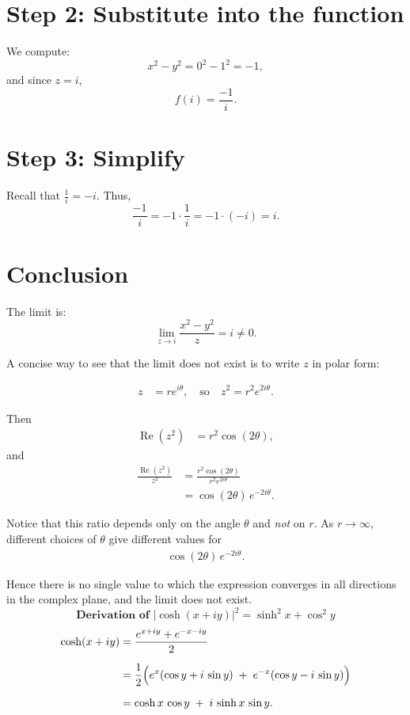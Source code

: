\documentclass[12pt]{article}
\theoremstyle{definition} %
\theoremstyle{plain} %
\begin{document}
\section*{Step 2: Substitute into the function}
We compute:
\[
x^2 - y^2 = 0^2 - 1^2 = -1,
\]
and since \(z = i\),
\[
f(i) = \frac{-1}{i}.
\]

\section*{Step 3: Simplify}
Recall that \(\frac{1}{i} = -i\). Thus,
\[
\frac{-1}{i} = -1 \cdot \frac{1}{i} = -1 \cdot (-i) = i.
\]

\section*{Conclusion}
The limit is:
\[
\lim_{z \to i} \frac{x^2 - y^2}{z} = i \neq 0.
\]

A concise way to see that the limit does not exist is to write $z$ in polar form:

\begin{align}
z &= r e^{i\theta}, \quad \text{so} \quad z^2 = r^2 e^{2i\theta}.
\end{align}

Then
\begin{align}
\operatorname{Re}(z^2) &= r^2 \cos(2\theta),
\end{align}
and
\begin{align}
\frac{\operatorname{Re}(z^2)}{z^2} 
&= \frac{r^2 \cos(2\theta)}{r^2 e^{2i\theta}} \\
&= \cos(2\theta)\,e^{-2i\theta}.
\end{align}

Notice that this ratio depends only on the angle $\theta$ and \emph{not} on $r$. As $r \to \infty$, different choices of $\theta$ give different values for 
\begin{align}
\cos(2\theta)\,e^{-2i\theta}.
\end{align}

Hence there is no single value to which the expression converges in all directions in the complex plane, and the limit does not exist.
\[
\textbf{Derivation of }|\cosh(x + i y)|^2 = \sinh^2 x + \cos^2 y
\]
\begin{align*}
\cosh(x + i y) 
&= \frac{e^{x + i y} + e^{-x - i y}}{2} \\[6pt]
&= \frac{1}{2} \Bigl( e^x(\cos y + i\,\sin y) \;+\; e^{-x}(\cos y - i\,\sin y)\Bigr) \\[6pt]
&= \cosh x\,\cos y \;+\; i\,\sinh x\,\sin y.
\end{align*}
\end{document}
